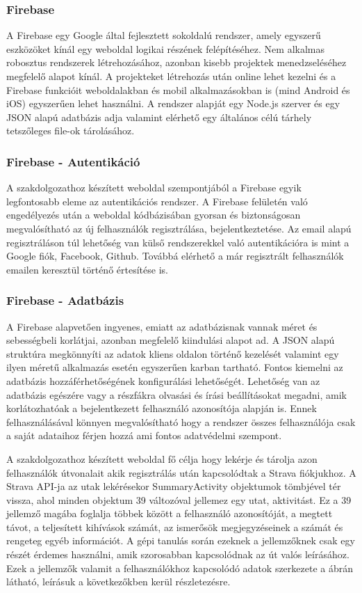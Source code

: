 \subsubsection{Firebase}
A Firebase \cite{firebase} egy Google által fejlesztett sokoldalú rendszer, amely egyszerű eszközöket kínál egy weboldal logikai részének felépítéséhez. Nem alkalmas robosztus rendszerek létrehozásához, azonban kisebb projektek menedzseléséhez megfelelő alapot kínál. A projekteket létrehozás után online lehet kezelni és a Firebase funkcióit weboldalakban és mobil alkalmazásokban is (mind Android és iOS) egyszerűen lehet használni. A rendszer alapját egy Node.js szerver és egy JSON alapú adatbázis adja valamint elérhető egy általános célú tárhely tetszőleges file-ok tárolásához. 

\subsubsection{Firebase - Autentikáció}
A szakdolgozathoz készített weboldal szempontjából a Firebase egyik legfontosabb eleme az autentikációs rendszer. A Firebase felületén való engedélyezés után a weboldal kódbázisában gyorsan és biztonságosan megvalósítható az új felhasználók regisztrálása, bejelentkeztetése. Az email alapú regisztráláson túl lehetőség van külső rendszerekkel való autentikációra is mint a Google fiók, Facebook, Github. Továbbá elérhető a már regisztrált felhasználók emailen keresztül történő értesítése is.

\subsubsection{Firebase - Adatbázis}
A Firebase alapvetően ingyenes, emiatt az adatbázisnak vannak méret és sebességbeli korlátjai, azonban megfelelő kiindulási alapot ad. A JSON alapú struktúra megkönnyíti az adatok kliens oldalon történő kezelését valamint egy ilyen méretű alkalmazás esetén egyszerűen karban tartható. Fontos kiemelni az adatbázis hozzáférhetőségének konfigurálási lehetőségét. Lehetőség van az adatbázis egészére vagy a részfákra olvasási és írási beállításokat megadni, amik korlátozhatóak a bejelentkezett felhasználó azonosítója alapján is. Ennek felhasználásával könnyen megvalósítható hogy a rendszer összes felhasználója csak a saját adataihoz férjen hozzá ami fontos adatvédelmi szempont.

 \label{ssec:adatstruktura}
A szakdolgozathoz készített weboldal fő célja hogy lekérje és tárolja azon felhasználók útvonalait akik regisztrálás után kapcsolódtak a Strava fiókjukhoz. A Strava API-ja az utak lekérésekor SummaryActivity objektumok tömbjével tér vissza, ahol minden objektum 39 változóval jellemez egy utat, aktivitást. Ez a 39 jellemző magába foglalja többek között a felhasználó azonosítóját, a megtett távot, a teljesített kihívások számát, az ismerősök megjegyzéseinek a számát és rengeteg egyéb információt. A gépi tanulás során ezeknek a jellemzőknek csak egy részét érdemes használni, amik szorosabban kapcsolódnak az út valós leírásához. Ezek a jellemzők valamit a felhasználókhoz kapcsolódó adatok szerkezete a  ábrán látható, leírásuk a következőkben kerül részletezésre.

